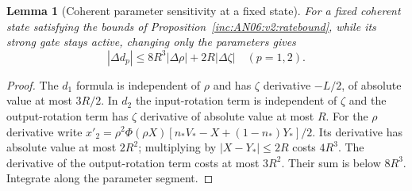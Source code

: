 \documentclass[11pt]{article}
\numberwithin{equation}{section}
\newtheorem{lemma}[theorem]{Lemma}
\theoremstyle{remark}\newtheorem{remark}[theorem]{Remark}
\newcommand{\1}{\mathbf 1}
\begin{document}
\begin{lemma}[Coherent parameter sensitivity at a fixed state]
\label{inc:AN06:v2:paramrate}
For a fixed coherent state satisfying the bounds of
Proposition~\ref{inc:AN06:v2:ratebound}, while its strong gate stays active,
changing only the parameters gives
\[
 |\Delta d_p|\le8R^3|\Delta\rho|+2R|\Delta\zeta|\quad(p=1,2).
\]
\end{lemma}
\begin{proof}
The $d_1$ formula is independent of $\rho$ and has $\zeta$ derivative
$-L/2$, of absolute value at most $3R/2$.
In $d_2$ the input-rotation term is independent of $\zeta$ and the
output-rotation term has $\zeta$ derivative of absolute value at most $R$.
For the $\rho$ derivative write
$x'_2=\rho^2\Phi(\rho X)[n_*V_*-X+(1-n_*)Y_*]/2$.
Its derivative has absolute value at most $2R^2$; multiplying by
$|X-Y_*|\le2R$ costs $4R^3$.
The derivative of the output-rotation term costs at most $3R^2$.
Their sum is below $8R^3$. Integrate along the parameter segment.
\end{proof}
\end{document}
